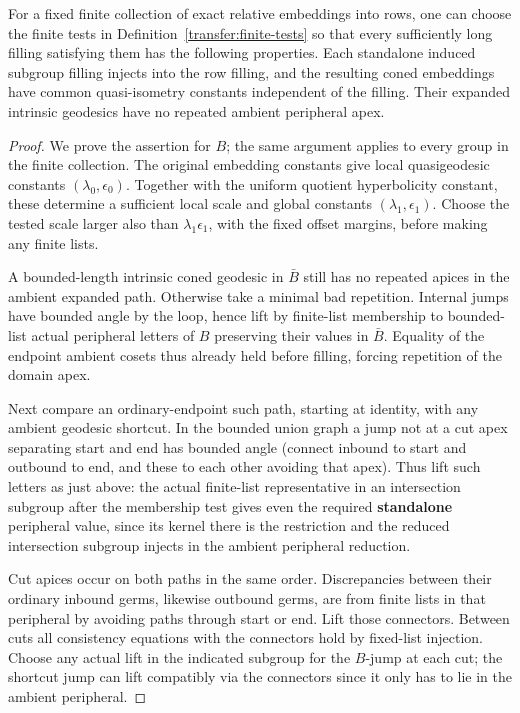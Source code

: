 \begin{lemma}\label{transfer:subgroup-filling}
For a fixed finite collection of exact relative embeddings into rows, one can choose the finite tests in Definition~\ref{transfer:finite-tests} so that every sufficiently long filling satisfying them has the following properties. Each standalone induced subgroup filling injects into the row filling, and the resulting coned embeddings have common quasi-isometry constants independent of the filling. Their expanded intrinsic geodesics have no repeated ambient peripheral apex.
\end{lemma}
\begin{proof}
We prove the assertion for \(B\); the same argument applies to every group in the finite collection. The original embedding constants give local quasigeodesic constants \((\lambda_0,\epsilon_0)\). Together with the uniform quotient hyperbolicity constant, these determine a sufficient local scale and global constants \((\lambda_1,\epsilon_1)\). Choose the tested scale larger also than \(\lambda_1\epsilon_1\), with the fixed offset margins, before making any finite lists.

A bounded-length intrinsic coned geodesic in \(\bar B\) still has no repeated apices in the ambient expanded path. Otherwise take a minimal bad repetition. Internal jumps have bounded angle by the loop, hence lift by finite-list membership to bounded-list actual peripheral letters of \(B\) preserving their values in \(\bar B\). Equality of the endpoint ambient cosets thus already held before filling, forcing repetition of the domain apex.

Next compare an ordinary-endpoint such path, starting at identity, with any ambient geodesic shortcut. In the bounded union graph a jump not at a cut apex separating start and end has bounded angle (connect inbound to start and outbound to end, and these to each other avoiding that apex). Thus lift such letters as just above: the actual finite-list representative in an intersection subgroup after the membership test gives even the required \textbf{standalone} peripheral value, since its kernel there is the restriction and the reduced intersection subgroup injects in the ambient peripheral reduction.

Cut apices occur on both paths in the same order. Discrepancies between their ordinary inbound germs, likewise outbound germs, are from finite lists in that peripheral by avoiding paths through start or end. Lift those connectors. Between cuts all consistency equations with the connectors hold by fixed-list injection. Choose any actual lift in the indicated subgroup for the \(B\)-jump at each cut; the shortcut jump can lift compatibly via the connectors since it only has to lie in the ambient peripheral.


\end{proof}
